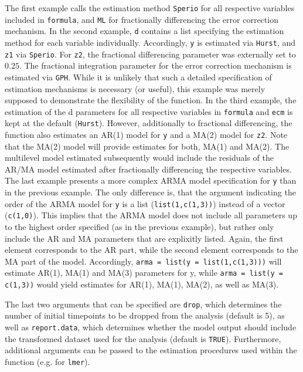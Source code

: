 \documentclass[12pt]{paper}\usepackage[]{graphicx}\usepackage[]{color}
\begin{document}
The first example calls the estimation method \texttt{Sperio} for all respective variables included in \texttt{formula}, and \texttt{ML} for fractionally differencing the error correction mechanism. In the second example, \texttt{d} contains a list specifying the estimation method for each variable individually. Accordingly, \texttt{y} is estimated via \texttt{Hurst}, and \texttt{z1} via \texttt{Sperio}. For \texttt{z2}, the fractional differencing parameter was externally set to $0.25$. The fractional integration parameter for the error correction mechanism is estimated via \texttt{GPH}. While it is unlikely that such a detailed specification of estimation mechanisms is necessary (or useful), this example was merely supposed to demonstrate the flexibility of the function. In the third example, the estimation of the d parameters for all respective variables in \texttt{formula} and \texttt{ecm} is kept at the default (\texttt{Hurst}). However, additionally to fractional differencing, the function also estimates an AR(1) model for \texttt{y} and a MA(2) model for \texttt{z2}. Note that the MA(2) model will provide estimates for both, MA(1) and MA(2). The multilevel model estimated subsequently would include the residuals of the AR/MA model estimated after fractionally differencing the respective variables. The last example presents a more complex ARMA model specification for \texttt{y} than in the previous example. The only difference is, that the argument indicating the order of the ARMA model for \texttt{y} is a list (\texttt{list(1,c(1,3))}) instead of a vector (\texttt{c(1,0)}). This implies that the ARMA model does not include all parameters up to the highest order specified (as in the previous example), but rather only include the AR and MA parameters that are explixitly listed. Again, the first element corresponds to the AR part, while the second element corresponds to the MA part of the model. Accordingly, \texttt{arma = list(y = list(1,c(1,3)))} will estimate AR(1), MA(1) and MA(3) parameters for y, while \texttt{arma = list(y = c(1,3))} would yield estimates for AR(1), MA(1), MA(2), as well as MA(3).

The last two arguments that can be specified are \texttt{drop}, which determines the number of initial timepoints to be dropped from the analysis (default is 5), as well as \texttt{report.data}, which determines whether the model output should include the transformed dataset used for the analysis (default is \texttt{TRUE}). Furthermore, additional arguments can be passed to the estimation procedures used within the function (e.g. for \texttt{lmer}).
\end{document}
